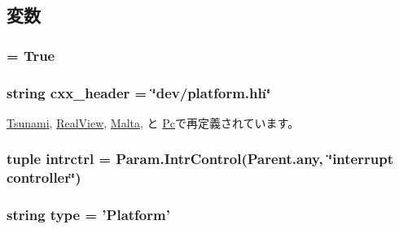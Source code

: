 \subsection{変数}
\hypertarget{classPlatform_1_1Platform_a17fa61ac3806b481cafee5593b55e5d0}{
\subsubsection[{abstract}]{ = True}}
\label{classPlatform_1_1Platform_a17fa61ac3806b481cafee5593b55e5d0}
\hypertarget{classPlatform_1_1Platform_a17da7064bc5c518791f0c891eff05fda}{
\subsubsection[{cxx\_\-header}]{\setlength{\rightskip}{0pt plus 5cm}string {\bf cxx\_\-header} = \char`\"{}dev/platform.hh\char`\"{}}}
\label{classPlatform_1_1Platform_a17da7064bc5c518791f0c891eff05fda}


\hyperlink{classTsunami_1_1Tsunami_a17da7064bc5c518791f0c891eff05fda}{Tsunami}, \hyperlink{classRealView_1_1RealView_a17da7064bc5c518791f0c891eff05fda}{RealView}, \hyperlink{classMalta_1_1Malta_a17da7064bc5c518791f0c891eff05fda}{Malta}, と \hyperlink{classPc_1_1Pc_a17da7064bc5c518791f0c891eff05fda}{Pc}で再定義されています。\hypertarget{classPlatform_1_1Platform_af66276cad0c0f97f0e6b4c82caec5776}{
\subsubsection[{intrctrl}]{\setlength{\rightskip}{0pt plus 5cm}tuple {\bf intrctrl} = Param.IntrControl(Parent.any, \char`\"{}interrupt controller\char`\"{})}}
\label{classPlatform_1_1Platform_af66276cad0c0f97f0e6b4c82caec5776}
\hypertarget{classPlatform_1_1Platform_acce15679d830831b0bbe8ebc2a60b2ca}{
\subsubsection[{type}]{\setlength{\rightskip}{0pt plus 5cm}string {\bf type} = '{\bf Platform}'}}
\label{classPlatform_1_1Platform_acce15679d830831b0bbe8ebc2a60b2ca}


